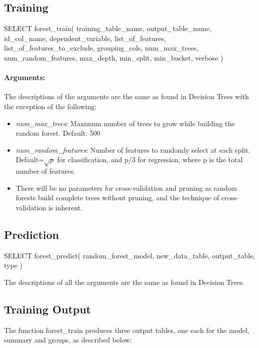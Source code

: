 \subsection{Training} %
\label{sub:training}
\begin{sql}
    SELECT forest_train(
            training_table_name,
            output_table_name,
            id_col_name,
            dependent_variable,
            list_of_features,
            list_of_features_to_exclude,
            grouping_cols,
            num_max_trees,
            num_random_features,
            max_depth,
            min_split,
            min_bucket,
            verbose
    )
\end{sql}

\paragraph{Arguments:}

The descriptions of the arguments are the same as found in Decision Trees with the exception
of the following:

\begin{itemize}
    \item \emph{num\_max\_trees}: Maximum number of trees to grow while building the random forest. Default: 500
    \item \emph{num\_random\_features}: Number of features to randomly select at each split. Default=$\sqrt{p}$ for
    classification, and p/3 for regression, where p is the total number of features.
    \item There will be no parameters for cross-validation and pruning as random forests build complete
    trees without pruning, and the technique of cross-validation is inherent.
\end{itemize}

\subsection{Prediction} %
\label{sub:prediction}
\begin{sql}
    SELECT forest_predict(
            random_forest_model,
            new_data_table,
            output_table,
            type
    )
\end{sql}
The descriptions of all the arguments are the same as found in Decision Trees.
\\
\subsection{Training Output} %
\label{sub:training_out}
The function forest\_train produces three output tables, one each for the model, summary 
and groups, as described below:

